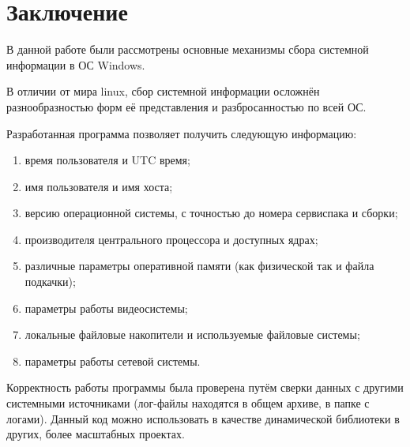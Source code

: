 \documentclass[a4paper, 12pt]{report}		%
\begin{document}
\chapter*{Заключение}

\vspace{1em}

В данной работе были рассмотрены основные механизмы сбора системной информации в ОС Windows.
\vspace{1em}

В отличии от мира linux, сбор системной информации осложнён разнообразностью форм её представления и разбросанностью по всей ОС.
\vspace{1em}

Разработанная программа позволяет получить следующую информацию:
\begin{enumerate}
\item время пользователя и UTC время;
\item имя пользователя и имя хоста;
\item версию операционной системы, с точностью до номера сервиспака и сборки;
\item производителя центрального процессора и доступных ядрах;
\item различные параметры оперативной памяти (как физической так и файла подкачки);
\item параметры работы видеосистемы;
\item локальные файловые накопители и используемые файловые системы;
\item параметры работы сетевой системы.
\end{enumerate}
\vspace{1em}

Корректность работы программы была проверена путём сверки данных с другими системными источниками (лог-файлы находятся в общем архиве, в папке с логами). Данный код можно использовать в качестве динамической библиотеки в других, более масштабных проектах.
\end{document}
